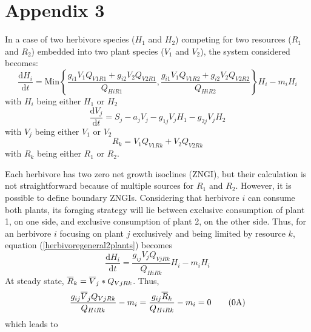 \documentclass[12pt]{article}
\newcommand\equa[1]{\frac{\mathrm{d}#1}{\mathrm{d}t}}
\newcommand\barre[1]{\overline{\rule{0pt}{1.5ex}#1}}
\begin{document}
\section*{Appendix 3}
In a case of two herbivore species ($H_1$ and $H_2$) competing for two resources ($R_1$ and $R_2$) embedded into two plant species ($V_1$ and $V_2$), the system considered becomes:
\begin{equation}\label{herbivoregeneral2plants}
\equa{H_i}= \text{Min} \left \lbrace \frac{g_{i1}V_1Q_{V1R1}+g_{i2}V_2Q_{V2R1}}{Q_{HiR1}}, \frac{g_{i1}V_1Q_{V1R2}+g_{i2}V_2Q_{V2R2}}{Q_{HiR2}}  \right \rbrace H_i -m_i H_i \tag{\theequation A}
\end{equation}
with $H_i$ being either $H_1$ or $H_2$
\begin{equation}
\equa{V_j}=S_j-a_jV_j-g_{1j}V_jH_1-g_{2j}V_jH_2 \tag{\theequation A}
\end{equation} 
with $V_j$ being either $V_1$ or $V_2$
\begin{equation}
R_k=V_1 Q_{V1Rk} +V_2 Q_{V2Rk} \tag{\theequation A}
\end{equation} 
with $R_k$ being either $R_1$ or $R_2$.
\par
Each herbivore has two zero net growth isoclines (ZNGI), but their calculation is not straightforward because of multiple sources for $R_1$ and $R_2$. However, it is possible to define boundary ZNGIs. Considering that herbivore $i$ can consume both plants, its foraging strategy will lie between exclusive consumption of plant 1, on one side, and exclusive consumption of plant 2, on the other side. Thus, for an herbivore $i$ focusing on plant $j$ exclusively and being limited by resource $k$, equation (\ref{herbivoregeneral2plants}) becomes 
\begin{equation}
\equa{H_i}=\frac{\displaystyle g_{ij} V_j Q_{VjRk}}{Q_{HiRk}}H_i   -m_i H_i \tag{\theequation A}
\end{equation}
At steady state, $\barre{R}_k=\barre{V}_j*Q_{VjRk}$. Thus,
\begin{equation}
\frac{\displaystyle g_{ij} \barre{V}_j Q_{VjRk}}{Q_{HiRk}}   -m_i =\frac{\displaystyle g_{ij} \barre{R}_k}{Q_{HiRk}}   -m_i=0 \tag{\theequation A}
\end{equation}
which leads to
\end{document}
